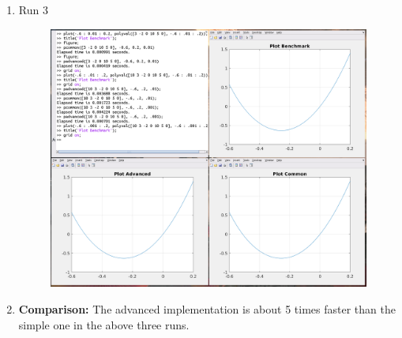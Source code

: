 \documentclass[12pt,a4paper]{article}
\begin{document}
\begin{enumerate}[leftmargin=!,labelindent=5pt]
	\item Run 3
		\begin{figure}[H]
			\centering
			\includegraphics[scale=0.45]{./img/poly_comp_03.png}
		\end{figure}

	\item \textbf{Comparison:}
		\newline
		\newline The advanced implementation is about 5 times faster than the simple one
		in the above three runs.
\end{enumerate}
\newpage
\end{document}
